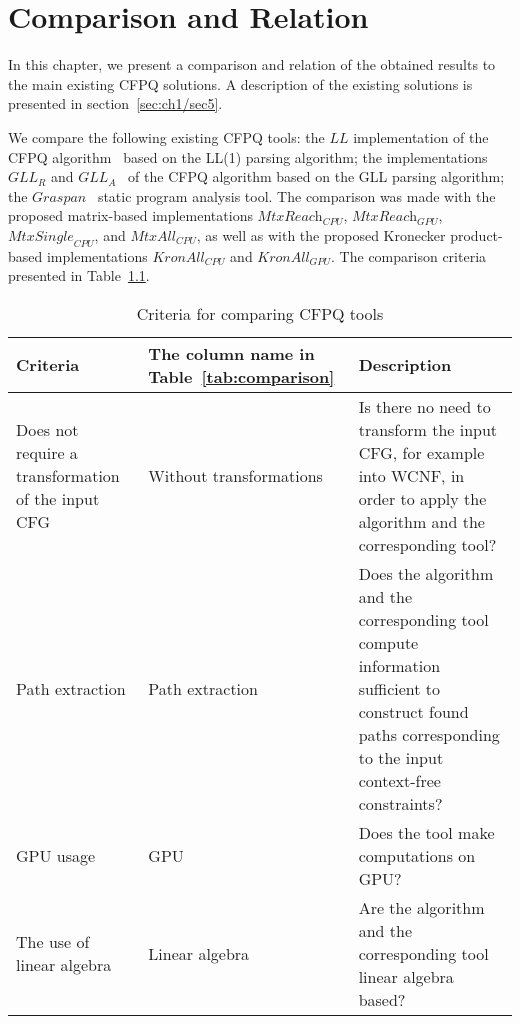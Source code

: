 \chapter{Comparison and Relation}\label{ch:ch6}
In this chapter, we present a comparison and relation of the obtained results to the main existing CFPQ solutions. A description of the existing solutions is presented in section~\ref{sec:ch1/sec5}.

We compare the following existing CFPQ tools: the $\textit{LL}$ implementation of the CFPQ algorithm~\cite{medeiros2018efficient} based on the LL(1) parsing algorithm; the implementations $\textit{GLL}_{\textit{R}}$ and $\textit{GLL}_{\textit{A}}$~\cite{grigorev2017context} of the CFPQ algorithm based on the GLL parsing algorithm; the $\textit{Graspan}$~\cite{graspan} static program analysis tool. The comparison was made with the proposed matrix-based implementations $\textit{MtxReach}_{\textit{CPU}}$, $\textit{MtxReach}_{\textit{GPU}}$, $\textit{MtxSingle}_{\textit{CPU}}$, and $\textit{MtxAll}_{\textit{CPU}}$, as well as with the proposed Kronecker product-based implementations $\textit{KronAll}_{\textit{CPU}}$ and $\textit{KronAll}_{\textit{GPU}}$. The comparison criteria presented in Table~\ref{tab:compCriteria}. 

\begin{table} [h]
  \centering
  \begin{threeparttable}%
  \caption{Criteria for comparing CFPQ tools}\label{tab:compCriteria}
  \begin{tabular}{| p{4.5cm} | p{3.2cm} | p{8cm} |}
  \hline                               
  \hline
  Criteria & The column name in Table~\ref{tab:comparison} & Description \\
  \hline
  Does not require a transformation of the input CFG & Without transformations & Is there no need to transform the input CFG, for example into WCNF, in order to apply the algorithm and the corresponding tool?\\
  Path extraction  & Path extraction  & Does the algorithm and the corresponding tool compute information sufficient to construct found paths corresponding to the input context-free constraints?\\
  GPU usage & GPU & Does the tool make computations on GPU?\\
  The use of linear algebra   & Linear algebra & Are the algorithm and the corresponding tool linear algebra based?\\
  \hline
  \hline
  \end{tabular}
  \end{threeparttable}
\end{table}

